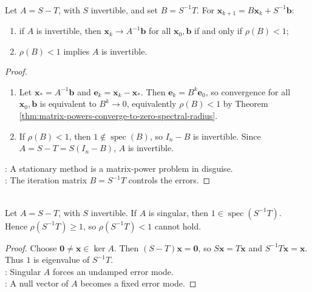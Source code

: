 \begin{theorem} \label{thm:splitting-iteration-convergence-spectral-radius} \\
Let $A=S-T$, with $S$ invertible, and set $B=S^{-1}T$. For $\mathbf{x}_{k+1}=B\mathbf{x}_k+S^{-1}\mathbf{b}$:
\begin{enumerate}[label=(\roman*)]
\setlength{\itemsep}{0pt}
\item if $A$ is invertible, then $\mathbf{x}_k\to A^{-1}\mathbf{b}$ for all $\mathbf{x}_0,\mathbf{b}$ if and only if $\rho(B)<1$;
\item $\rho(B)<1$ implies $A$ is invertible.
\end{enumerate}
\begin{proof}
\begin{enumerate}[label=(\roman*)]
\setlength{\itemsep}{0pt}
\item Let $\mathbf{x}_*=A^{-1}\mathbf{b}$ and $\mathbf{e}_k=\mathbf{x}_k-\mathbf{x}_*$. Then $\mathbf{e}_k=B^k\mathbf{e}_0$, so convergence for all $\mathbf{x}_0,\mathbf{b}$ is equivalent to $B^k\to0$, equivalently $\rho(B)<1$ by Theorem \ref{thm:matrix-powers-converge-to-zero-spectral-radius}.
\item If $\rho(B)<1$, then $1\notin\operatorname{spec}(B)$, so $I_n-B$ is invertible. Since $A=S-T=S(I_n-B)$, $A$ is invertible.
\end{enumerate}
: A stationary method is a matrix-power problem in disguise.\\
: The iteration matrix $B=S^{-1}T$ controls the errors.
\end{proof}
\end{theorem}

\begin{corollary} \label{cor:singular-matrix-splitting-obstruction} \\
Let $A=S-T$, with $S$ invertible. If $A$ is singular, then $1\in\operatorname{spec}(S^{-1}T)$.\\
Hence $\rho(S^{-1}T)\geq1$, so $\rho(S^{-1}T)<1$ cannot hold.
\begin{proof}
Choose $\mathbf{0}\neq\mathbf{x}\in\ker A$. Then $(S-T)\mathbf{x}=\mathbf{0}$, so $S\mathbf{x}=T\mathbf{x}$ and $S^{-1}T\mathbf{x}=\mathbf{x}$. Thus $1$ is eigenvalue of $S^{-1}T$.\\
: Singular $A$ forces an undamped error mode.\\
: A null vector of $A$ becomes a fixed error mode.
\end{proof}
\end{corollary}

